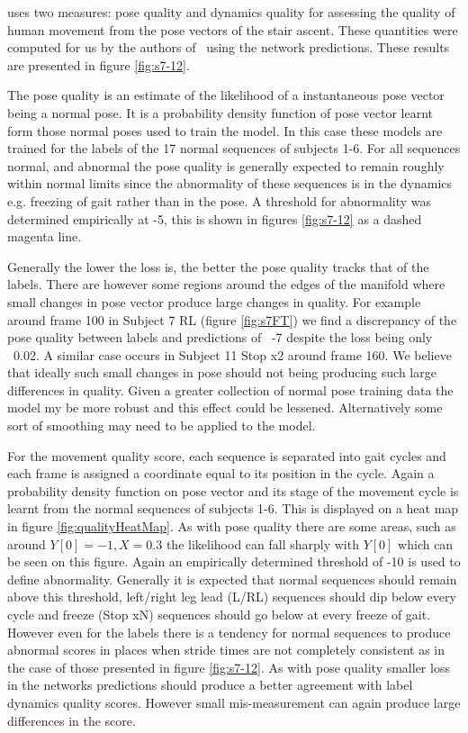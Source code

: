 \documentclass[11pt]{article} %
\begin{document}
\cite{Paiement} uses two measures: pose quality and dynamics quality for assessing the quality of human movement from the pose vectors of the stair ascent. These quantities were computed for us by the authors of~\cite{Paiement} using the network predictions. These results are presented in figure \ref{fig:s7-12}. 

The pose quality is an estimate of the likelihood of a instantaneous pose vector being a normal pose. It is a probability density function of pose vector learnt form those normal poses used to train the model. In this case these models are trained for the labels of the 17 normal sequences of subjects 1-6. For all sequences normal, and abnormal the pose quality is generally expected to remain roughly within normal limits since the abnormality of these sequences is in the dynamics e.g. freezing of gait rather than in the pose. A threshold for abnormality was determined empirically at -5, this is shown in figures \ref{fig:s7-12} as a dashed magenta line.

Generally the lower the loss is, the better the pose quality tracks that of the labels. There are however some regions around the edges of the manifold where small changes in pose vector produce large changes in quality. For example around frame 100 in Subject 7 RL (figure \ref{fig:s7FT}) we find a discrepancy of the pose quality between labels and predictions of ~-7 despite the loss being only ~0.02. A similar case occurs in Subject 11 Stop x2 around frame 160. We believe that ideally such small changes in pose should not being producing such large differences in quality. Given a greater collection of normal pose training data the model my be more robust and this effect could be lessened. Alternatively some sort of smoothing may need to be applied to the model. 

For the movement quality score, each sequence is separated into gait cycles and each frame is assigned a coordinate equal to its position in the cycle. Again a probability density function on pose vector and its stage of the movement cycle is learnt from the normal sequences of subjects 1-6. This is displayed on a heat map in figure \ref{fig:qualityHeatMap}. As with pose quality there are some areas, such as around $Y[0]=-1,X=0.3$ the likelihood can fall sharply with $Y[0]$ which can be seen on this figure. Again an empirically determined threshold of -10 is used to define abnormality. Generally it is expected that normal sequences should remain above this threshold, left/right leg lead (L/RL) sequences should dip below every cycle and freeze (Stop xN) sequences should go below at every freeze of gait. However even for the labels there is a tendency for normal sequences to produce abnormal scores in places when stride times are not completely consistent as in the case of those presented in figure \ref{fig:s7-12}. As with pose quality smaller loss in the networks predictions should produce a better agreement with label dynamics quality scores. However small mis-measurement can again produce large differences in the score. 
\end{document}
